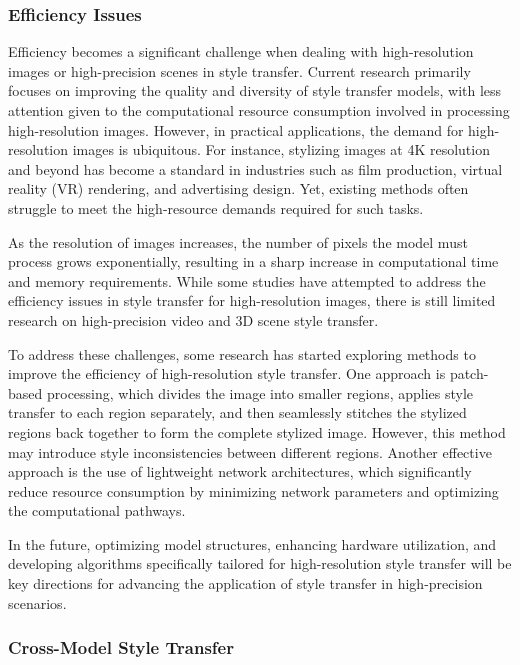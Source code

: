 \documentclass[preprint,12pt]{elsarticle}
\begin{document}
\subsubsection{Efficiency Issues}

Efficiency becomes a significant challenge when dealing with high-resolution images or high-precision scenes in style transfer. Current research primarily focuses on improving the quality and diversity of style transfer models, with less attention given to the computational resource consumption involved in processing high-resolution images. However, in practical applications, the demand for high-resolution images is ubiquitous. For instance, stylizing images at 4K resolution and beyond has become a standard in industries such as film production, virtual reality (VR) rendering, and advertising design. Yet, existing methods often struggle to meet the high-resource demands required for such tasks.

As the resolution of images increases, the number of pixels the model must process grows exponentially, resulting in a sharp increase in computational time and memory requirements. While some studies have attempted to address the efficiency issues in style transfer for high-resolution images, there is still limited research on high-precision video and 3D scene style transfer.

To address these challenges, some research has started exploring methods to improve the efficiency of high-resolution style transfer. One approach is patch-based processing, which divides the image into smaller regions, applies style transfer to each region separately, and then seamlessly stitches the stylized regions back together to form the complete stylized image. However, this method may introduce style inconsistencies between different regions. Another effective approach is the use of lightweight network architectures, which significantly reduce resource consumption by minimizing network parameters and optimizing the computational pathways.

In the future, optimizing model structures, enhancing hardware utilization, and developing algorithms specifically tailored for high-resolution style transfer will be key directions for advancing the application of style transfer in high-precision scenarios.

\subsubsection{Cross-Model Style Transfer}
\end{document}
